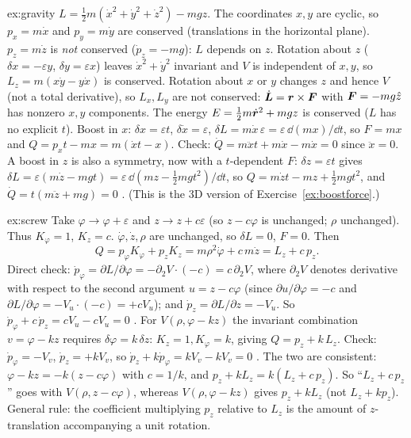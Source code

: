 \documentclass[11pt]{article}
\newcommand{\eps}{\varepsilon}
\begin{document}
\begin{solution}{ex:gravity}
$L=\tfrac12m(\dot x^2+\dot y^2+\dot z^2)-mgz$. The coordinates $x,y$ are cyclic, so $p_x=m\dot x$ and $p_y=m\dot y$ are conserved (translations in the horizontal plane). $p_z=m\dot z$ is \emph{not} conserved ($\dot p_z=-mg$): $L$ depends on $z$. Rotation about $z$ ($\delta x=-\eps y$, $\delta y=\eps x$) leaves $\dot x^2+\dot y^2$ invariant and $V$ is independent of $x,y$, so $L_z=m(x\dot y-y\dot x)$ is conserved. Rotation about $x$ or $y$ changes $z$ and hence $V$ (not a total derivative), so $L_x,L_y$ are not conserved: $\dot{\bm{L}}=\bm{r}\times\bm{F}$ with $\bm{F}=-mg\hat z$ has nonzero $x,y$ components. The energy $E=\tfrac12m\dot{\bm{r}}^2+mgz$ is conserved ($L$ has no explicit $t$). Boost in $x$: $\delta x=\eps t$, $\delta\dot x=\eps$, $\delta L=m\dot x\,\eps=\eps\,\dd(mx)/\dd t$, so $F=mx$ and $Q=p_xt-mx=m(\dot xt-x)$. Check: $\dot Q=m\ddot xt+m\dot x-m\dot x=0$ since $\ddot x=0$. A boost in $z$ is also a symmetry, now with a $t$-dependent $F$: $\delta z=\eps t$ gives $\delta L=\eps(m\dot z-mgt)=\eps\,\dd(mz-\tfrac12mgt^2)/\dd t$, so $Q=m\dot zt-mz+\tfrac12mgt^2$, and $\dot Q=t(m\ddot z+mg)=0$ \checkmark. (This is the 3D version of Exercise~\ref{ex:boostforce}.)
\end{solution}

\begin{solution}{ex:screw}
Take $\varphi\to\varphi+\eps$ and $z\to z+c\eps$ (so $z-c\varphi$ is unchanged; $\rho$ unchanged). Thus $K_\varphi=1$, $K_z=c$. $\dot\varphi,\dot z,\rho$ are unchanged, so $\delta L=0$, $F=0$. Then
\begin{equation}
  Q=p_\varphi K_\varphi+p_zK_z=m\rho^2\dot\varphi+c\,m\dot z=L_z+c\,p_z .
\end{equation}
Direct check: $\dot p_\varphi=\partial L/\partial\varphi=-\partial_2V\cdot(-c)=c\,\partial_2V$, where $\partial_2V$ denotes derivative with respect to the second argument $u=z-c\varphi$ (since $\partial u/\partial\varphi=-c$ and $\partial L/\partial\varphi=-V_u\cdot(-c)=+cV_u$); and $\dot p_z=\partial L/\partial z=-V_u$. So $\dot p_\varphi+c\,\dot p_z=cV_u-cV_u=0$ \checkmark. For $V(\rho,\varphi-kz)$ the invariant combination $v=\varphi-kz$ requires $\delta\varphi=k\,\delta z$: $K_z=1,K_\varphi=k$, giving $Q=p_z+k\,L_z$. Check: $\dot p_\varphi=-V_v$, $\dot p_z=+kV_v$, so $\dot p_z+k\dot p_\varphi=kV_v-kV_v=0$ \checkmark. The two are consistent: $\varphi-kz=-k(z-c\varphi)$ with $c=1/k$, and $p_z+kL_z=k(L_z+c\,p_z)$. So ``$L_z+c\,p_z$'' goes with $V(\rho,z-c\varphi)$, whereas $V(\rho,\varphi-kz)$ gives $p_z+kL_z$ (not $L_z+kp_z$). General rule: the coefficient multiplying $p_z$ relative to $L_z$ is the amount of $z$-translation accompanying a unit rotation.
\end{solution}
\end{document}
